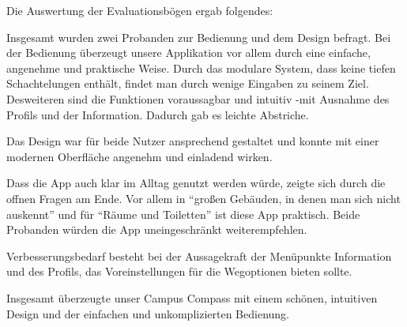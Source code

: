 Die Auswertung der Evaluationsbögen ergab folgendes:

Insgesamt wurden zwei Probanden zur Bedienung und dem Design befragt. 
Bei der Bedienung überzeugt unsere Applikation vor allem durch eine einfache, angenehme und praktische Weise. Durch das modulare System, dass keine tiefen Schachtelungen enthält, findet man durch wenige Eingaben zu seinem Ziel.
Desweiteren sind die Funktionen voraussagbar und intuitiv -mit Ausnahme des Profils und der Information. Dadurch gab es leichte Abstriche.

Das Design war für beide Nutzer ansprechend gestaltet und konnte mit einer modernen Oberfläche angenehm und einladend wirken.

Dass die App auch klar im Alltag genutzt werden würde, zeigte sich durch die offnen Fragen am Ende. Vor allem in “großen Gebäuden, in denen man sich nicht auskennt” und für “Räume und Toiletten” ist diese App praktisch.
Beide Probanden würden die App uneingeschränkt weiterempfehlen.

Verbesserungsbedarf besteht bei der Aussagekraft der Menüpunkte Information und des Profils, das Voreinstellungen für die Wegoptionen bieten sollte.

Insgesamt überzeugte unser Campus Compass mit einem schönen, intuitiven Design und der einfachen und unkomplizierten Bedienung.